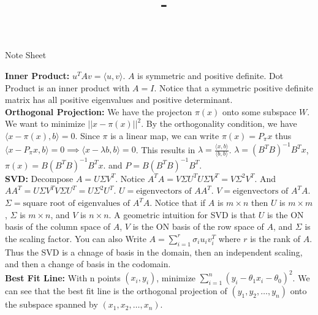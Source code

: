 \documentclass[answers,12pt,addpoints]{exam}
\author{\name}
\title{\course \ - \assignment}
\begin{document}
\maketitle
\newpage
\begin{center}
    Note Sheet
\end{center}

\textbf{Inner Product:} $u^T A v = \langle u, v \rangle$. $A$ is symmetric and positive definite. Dot Product is an inner product with $A = I$. Notice that a symmetric positive definite matrix has all positive eigenvalues and positive determinant.\\

\textbf{Orthogonal Projection:} We have the projecton $\pi(x)$ onto some subspace $W$. We want to minimize $||x - \pi(x)||^2$. By the orthogonality condition, we have $\langle x - \pi(x), b \rangle = 0$. Since $\pi$ is a linear map, we can write $\pi(x) = P_{\pi}x$ thus $\langle x - P_{\pi}x, b \rangle = 0 \implies \langle x - \lambda b, b \rangle = 0$. This results in $\lambda = \frac{\langle x, b \rangle}{\langle b, b \rangle}$. $\lambda = (B^T B)^{-1}B^T x$, $\pi(x) = B(B^T B)^{-1}B^T x$. and $P = B(B^T B)^{-1}B^T$.\\

\textbf{SVD:} Decompose $A = U\Sigma V^T$. Notice $A^TA = V\Sigma U^T U \Sigma V^T = V\Sigma^2V^T$. And $AA^T = U\Sigma V^T V \Sigma U^T = U \Sigma^2 U^T$. $U = \text{eigenvectors of } AA^T$. $V = \text{eigenvectors of } A^TA$. $\Sigma = \text{square root of eigenvalues of } A^TA$. Notice that if $A$ is $m \times n$ then $U$ is $m \times m$, $\Sigma$ is $m \times n$, and $V$ is $n \times n$. A geometric intuition for SVD is that $U$ is the ON basis of the column space of $A$, $V$ is the ON basis of the row space of $A$, and $\Sigma$ is the scaling factor. You can also Write $A = \sum_{i=1}^r \sigma_i u_i v_i^T$ where $r$ is the rank of $A$. Thus the SVD is a chnage of basis in the domain, then an independent scaling, and then a change of basis in the codomain.\\

\textbf{Best Fit Line:} With n points $(x_i, y_i)$, minimize $\sum_{i=1}^n (y_i - \theta_1 x_i - \theta_0)^2$. We can see that the best fit line is the orthogonal projection of $(y_1, y_2, \ldots, y_n)$ onto the subspace spanned by $(x_1, x_2, \ldots, x_n)$.\\
\end{document}
